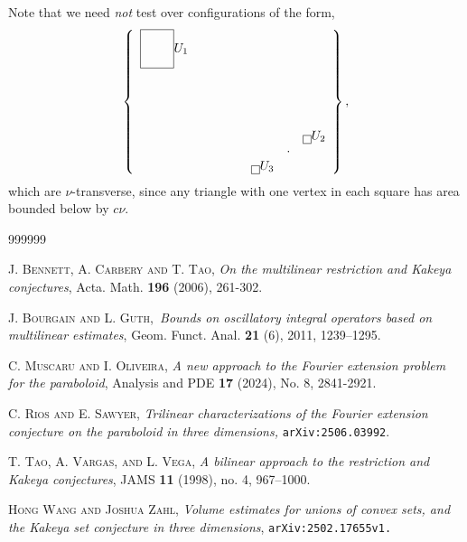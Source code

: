 \documentclass{amsart}%
\theoremstyle{plain}
\numberwithin{equation}{section}
\begin{document}
Note that we need \emph{not} test over configurations of the form,%
\[
\left\{
\begin{array}
[c]{cccccccc}%
\fbox{$%
\begin{array}
[c]{cc}
& \\
&
\end{array}
$}U_{1} &  &  &  &  &  &  & \\
&  &  &  &  &  &  & \\
&  &  &  &  &  &  & \\
&  &  &  &  &  &  & \\
&  &  &  &  &  &  & \\
&  &  &  &  &  &  & \fbox{}U_{2}\\
&  &  &  &  &  & \cdot & \\
&  &  &  &  & \fbox{}U_{3} &  &
\end{array}
\right\}  ,
\]
which are $\nu$-transverse, since any triangle with one vertex in each square
has area bounded below by $c\nu$.

\begin{thebibliography}{999999}                                                                                           %


\textsc{J. Bennett, A. Carbery and T. Tao}, \textit{On
the multilinear restriction and Kakeya conjectures}, Acta. Math. \textbf{196}
(2006), 261-302.

\textsc{J. Bourgain and L. Guth},\textit{\ Bounds on
oscillatory integral operators based on multilinear estimates}, Geom. Funct.
Anal. \textbf{21} (6), 2011, 1239--1295.

\textsc{C. Muscaru and I. Oliveira,} \textit{A new
approach to the Fourier extension problem for the paraboloid}, Analysis and
PDE \textbf{17} (2024), No. 8, 2841-2921.

\textsc{C. Rios and E. Sawyer,} \textit{Trilinear
characterizations of the Fourier extension conjecture on the paraboloid in
three dimensions, }\texttt{arXiv:2506.03992}.

\textsc{T. Tao, A. Vargas, and L. Vega}, \textit{A
bilinear approach to the restriction and Kakeya conjectures}, JAMS \textbf{11}
(1998), no. 4, 967--1000.

\textsc{Hong Wang and Joshua Zahl,} \textit{Volume
estimates for unions of convex sets, and the Kakeya set conjecture in three
dimensions}, \texttt{arXiv:2502.17655v1.}
\end{thebibliography}
\end{document}
